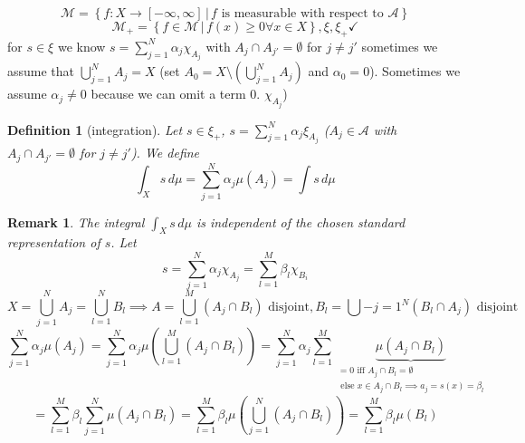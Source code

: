 \documentclass{article}
\newtheorem{definition}{Definition}  \numberwithin{definition}{section}
\newtheorem{remark}{Remark}  \numberwithin{remark}{section}
\newcommand{\setdef}[2]{\left\{\left.#1\,\right|\,#2\right\}}
\begin{document}
\[ \mathcal M = \setdef{f: X \to [-\infty, \infty]}{f \text{ is measurable with respect to } \mathcal A} \]
\[ \mathcal M_{+} = \setdef{f \in \mathcal M}{f(x) \geq 0 \forall x \in X}, \xi, \xi_+ \checkmark \]
for $s \in \xi$ we know $s = \sum_{j=1}^{N} \alpha_j \chi_{A_j}$ with $A_j \cap A_{j'} = \emptyset$ for $j \neq j'$
sometimes we assume that $\bigcup_{j=1}^{N} A_j = X$ (set $A_0 = X \setminus (\bigcup_{j=1}^N A_j)$ and $\alpha_0 = 0$).
Sometimes we assume $\alpha_j \neq 0$ because we can omit a term $0$. $\chi_{A_j}$)

\begin{definition}[integration]
  Let $s \in \xi_+$, $s = \sum_{j=1}^N \alpha_j \xi_{A_j}$ ($A_j \in \mathcal A$ with $A_j \cap A_{j'} = \emptyset$ for $j \neq j'$).
  We define
  \[ \int_X s \, d\mu = \sum_{j=1}^N \alpha_j \mu(A_j) = \int s \, d\mu \] %
\end{definition}

\begin{remark}
  The integral $\int_X s\, d\mu$ is independent of the chosen standard representation of $s$.
  Let \[ s = \sum_{j=1}^{N} \alpha_j \chi_{A_j} = \sum_{l=1}^{M} \beta_l \chi_{B_i} \]
  \[ X = \bigcup_{j=1}^N A_j = \bigcup_{l=1}^N B_l \implies A = \bigcup_{l=1}^M (A_j \cap B_l) \text{ disjoint}, B_l = \bigcup-{j=1}^N (B_l \cap A_j) \text{ disjoint} \]
  \[ \sum_{j=1}^N \alpha_j \mu(A_j) = \sum_{j=1}^N \alpha_j \mu\left(\bigcup_{l=1}^M (A_j \cap B_l)\right) = \sum_{j=1}^N \alpha_j \sum_{l=1}^M \underbrace{\mu(A_j \cap B_l)}_{\substack{= 0 \text{ iff } A_j \cap B_l = \emptyset \\ \text{ else } x \in A_j \cap B_l \implies a_j = s(x) = \beta_l}} \]
  \[ = \sum_{l=1}^{M} \beta_l \sum_{j=1}^{N} \mu (A_j \cap B_l) = \sum_{l=1}^M \beta_l \mu(\bigcup_{j=1}^N (A_j \cap B_l)) = \sum_{l=1}^M \beta_l \mu(B_l) \]
\end{remark}
\end{document}
